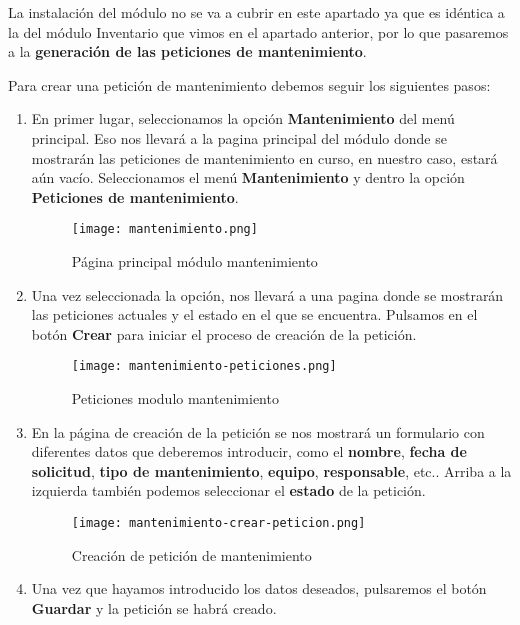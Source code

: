 La instalación del módulo no se va a cubrir en este apartado ya que es idéntica a la del módulo Inventario que vimos en el apartado anterior, por lo que pasaremos a la \textbf{generación de las peticiones de mantenimiento}.

Para crear una petición de mantenimiento debemos seguir los siguientes pasos:

\begin{enumerate}
    \item En primer lugar, seleccionamos la opción \textbf{Mantenimiento} del menú principal. Eso nos llevará a la pagina principal del módulo donde se mostrarán las peticiones de mantenimiento en curso, en nuestro caso, estará aún vacío. Seleccionamos el menú \textbf{Mantenimiento} y dentro la opción \textbf{Peticiones de mantenimiento}.

    \begin{figure}[ht]
        \centering
        \texttt{[image: mantenimiento.png]}
        \caption{Página principal módulo mantenimiento}
    \end{figure}

    \item Una vez seleccionada la opción, nos llevará a una pagina donde se mostrarán las peticiones actuales y el estado en el que se encuentra. Pulsamos en el botón \textbf{Crear} para iniciar el proceso de creación de la petición.

    \begin{figure}[ht]
        \centering
        \texttt{[image: mantenimiento-peticiones.png]}
        \caption{Peticiones modulo mantenimiento}
    \end{figure}

    \item En la página de creación de la petición se nos mostrará un formulario con diferentes datos que deberemos introducir, como el \textbf{nombre}, \textbf{fecha de solicitud}, \textbf{tipo de mantenimiento}, \textbf{equipo}, \textbf{responsable}, etc.. Arriba a la izquierda también podemos seleccionar el \textbf{estado} de la petición.

    \begin{figure}[ht]
        \centering
        \texttt{[image: mantenimiento-crear-peticion.png]}
        \caption{Creación de petición de mantenimiento}
    \end{figure}

    \item Una vez que hayamos introducido los datos deseados, pulsaremos el botón \textbf{Guardar} y la petición se habrá creado.
\end{enumerate}

